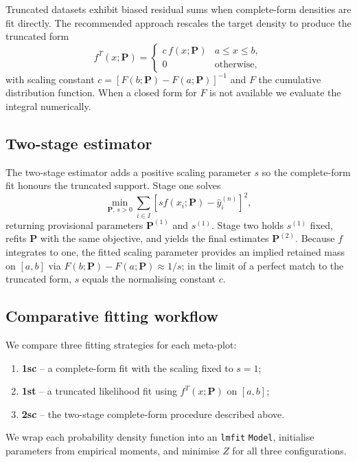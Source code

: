 Truncated datasets exhibit biased residual sums when complete-form densities are fit directly. The recommended approach rescales the target density to produce the truncated form
\begin{equation}
  f^{T}(x; \bm{P}) =
    \begin{cases}
      c\, f(x; \bm{P}) & a \leq x \leq b, \\
      0 & \text{otherwise},
    \end{cases}
\end{equation}
with scaling constant $c = [F(b; \bm{P}) - F(a; \bm{P})]^{-1}$ and $F$ the cumulative distribution function. When a closed form for $F$ is not available we evaluate the integral numerically.

\subsection{Two-stage estimator}
\label{sec:methods_twostage}

The two-stage estimator adds a positive scaling parameter $s$ so the complete-form fit honours the truncated support. Stage one solves
\begin{equation}
  \min_{\bm{P},\, s>0} \sum_{i \in I} \left[s f(x_i; \bm{P}) - \hat{y}_i^{(n)}\right]^2,
\end{equation}
returning provisional parameters $\bm{P}^{(1)}$ and $s^{(1)}$. Stage two holds $s^{(1)}$ fixed, refits $\bm{P}$ with the same objective, and yields the final estimates $\bm{P}^{(2)}$.
Because $f$ integrates to one, the fitted scaling parameter provides an implied retained mass on $[a,b]$ via $F(b;\bm{P})-F(a;\bm{P}) \approx 1/s$; in the limit of a perfect match to the truncated form, $s$ equals the normalising constant $c$.

\subsection{Comparative fitting workflow}
\label{sec:methods_benchmark}

We compare three fitting strategies for each meta-plot:
\begin{enumerate}
  \item \textbf{1sc} -- a complete-form fit with the scaling fixed to $s = 1$;
  \item \textbf{1st} -- a truncated likelihood fit using $f^{T}(x; \bm{P})$ on $[a, b]$;
  \item \textbf{2sc} -- the two-stage complete-form procedure described above.
\end{enumerate}
We wrap each probability density function into an \texttt{lmfit} \texttt{Model}, initialise parameters from empirical moments, and minimise $Z$ for all three configurations.

